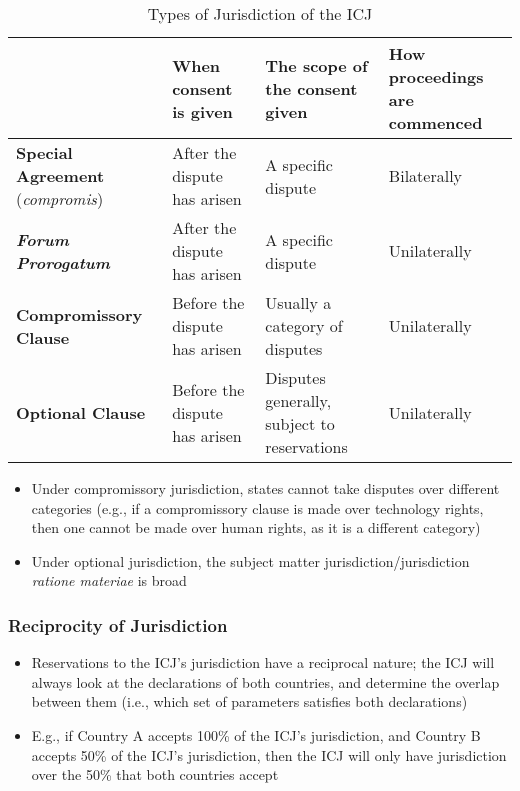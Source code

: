 \begin{table}[H]
    \centering
    \begin{tabular}{|p{}|p{}|p{}|p{}|}
        \hline & \textbf{When consent is given} & \textbf{The scope of the consent given} & \textbf{How proceedings are commenced} \\\hline
        \textbf{Special Agreement} (\textit{compromis}) & After the dispute has arisen & A specific dispute & Bilaterally \\\hline
        \textbf{\textit{Forum Prorogatum}} & After the dispute has arisen & A specific dispute & Unilaterally \\\hline
        \textbf{Compromissory Clause} & Before the dispute has arisen & Usually a category of disputes & Unilaterally \\\hline
        \textbf{Optional Clause} & Before the dispute has arisen & Disputes generally, subject to reservations & Unilaterally \\\hline
    \end{tabular}
    \caption{Types of Jurisdiction of the ICJ}
    \label{tab:icj-jurisdiction-types}
\end{table}

\begin{itemize}
    \item Under compromissory jurisdiction, states cannot take disputes over different categories (e.g., if a compromissory clause is made over technology rights, then one cannot be made over human rights, as it is a different category)
    \item Under optional jurisdiction, the subject matter jurisdiction/jurisdiction \textit{ratione materiae} is broad
\end{itemize}

\subsubsection{Reciprocity of Jurisdiction}

\begin{itemize}
    \item Reservations to the ICJ's jurisdiction have a reciprocal nature; the ICJ will always look at the declarations of both countries, and determine the overlap between them (i.e., which set of parameters satisfies both declarations)
    \item E.g., if Country A accepts 100\% of the ICJ's jurisdiction, and Country B accepts 50\% of the ICJ's jurisdiction, then the ICJ will only have jurisdiction over the 50\% that both countries accept
\end{itemize}

